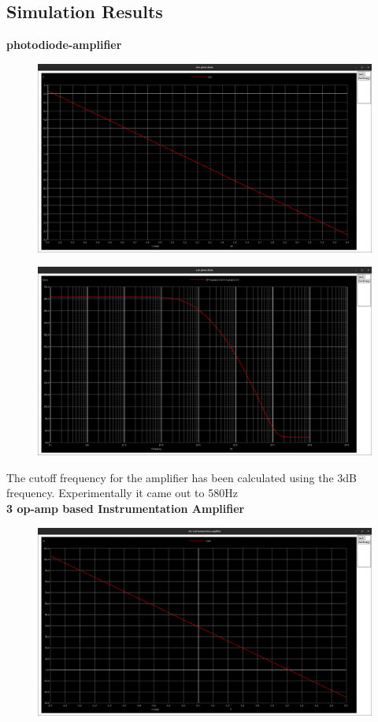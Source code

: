 \documentclass[12pt]{article}
\begin{document}
\subsection{Simulation Results}
\textbf{photodiode-amplifier}
\begin{figure}[h!]
\centering
\includegraphics[scale = 0.2]{q1_a.png}
\end{figure}
\newpage
\begin{figure}[h!]
\centering
\includegraphics[scale = 0.2]{q1_b.png}
\end{figure}
The cutoff frequency for the amplifier has been calculated using the 3dB
frequency. Experimentally it came out to 580Hz\\
\newpage
\newpage
\textbf{3 op-amp based Instrumentation Amplifier\\}
\begin{figure}[h!]
\centering
\includegraphics[scale = 0.2]{q2_a.png}
\end{figure}\\
\end{document}
